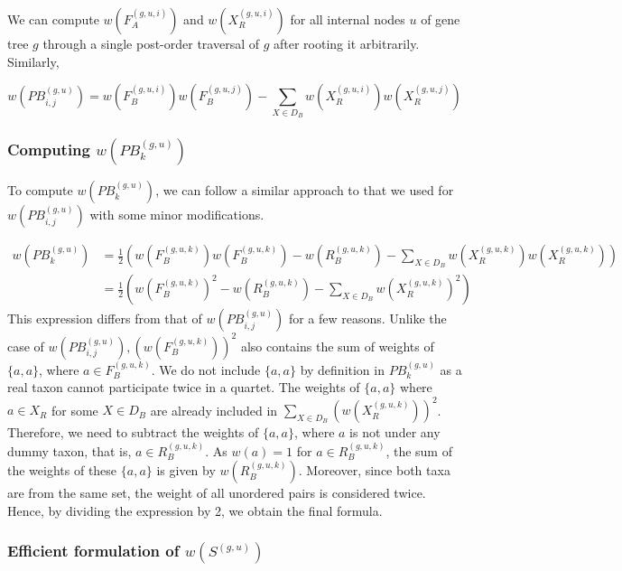 \documentclass{article}
\begin{document}
We can compute $w\left(F_A^{(g, u, i)}\right)$ and $w\left(X_R^{(g, u, i)}\right)$ for all internal nodes $u$ of gene tree $g$ through a single post-order traversal of $g$ after rooting it arbitrarily. Similarly,

\[
w\left(P B_{i, j}^{(g, u)}\right) = w\left(F_B^{(g, u, i)}\right) w\left(F_B^{(g, u, j)}\right) - \sum_{X \in D_B} w\left(X_R^{(g, u, i)}\right) w\left(X_R^{(g, u, j)}\right)
\]

\subsubsection{Computing $w\left(P B_k^{(g, u)}\right)$}

To compute $w\left(P B_k^{(g, u)}\right)$, we can follow a similar approach to that we used for $w\left(P B_{i, j}^{(g, u)}\right)$ with some minor modifications.

\[
\begin{aligned}
w\left(P B_k^{(g, u)}\right) & = \frac{1}{2} \left( w\left(F_B^{(g, u, k)}\right) w\left(F_B^{(g, u, k)}\right) - w\left(R_B^{(g, u, k)}\right) - \sum_{X \in D_B} w\left(X_R^{(g, u, k)}\right) w\left(X_R^{(g, u, k)}\right) \right) \\
& = \frac{1}{2} \left( w\left(F_B^{(g, u, k)}\right)^2 - w\left(R_B^{(g, u, k)}\right) - \sum_{X \in D_B} w\left(X_R^{(g, u, k)}\right)^2 \right)
\end{aligned}
\]
This expression differs from that of $w\left(P B_{i, j}^{(g, u)}\right)$ for a few reasons. Unlike the case of $w\left(P B_{i, j}^{(g, u)}\right), \left(w\left(F_B^{(g, u, k)}\right)\right)^2$ also contains the sum of weights of $\{a, a\}$, where $a \in F_B^{(g, u, k)}$. We do not include $\{a, a\}$ by definition in $P B_k^{(g, u)}$ as a real taxon cannot participate twice in a quartet. The weights of $\{a, a\}$ where $a \in X_R$ for some $X \in D_B$ are already included in $\sum_{X \in D_B} \left(w\left(X_R^{(g, u, k)}\right)\right)^2$. Therefore, we need to subtract the weights of $\{a, a\}$, where $a$ is not under any dummy taxon, that is, $a \in R_B^{(g, u, k)}$. As $w(a) = 1$ for $a \in R_B^{(g, u, k)}$, the sum of the weights of these $\{a, a\}$ is given by $w\left(R_B^{(g, u, k)}\right)$. Moreover, since both taxa are from the same set, the weight of all unordered pairs is considered twice. Hence, by dividing the expression by 2, we obtain the final formula.

\subsubsection{Efficient formulation of $w\left(S^{(g, u)}\right)$}
\end{document}
